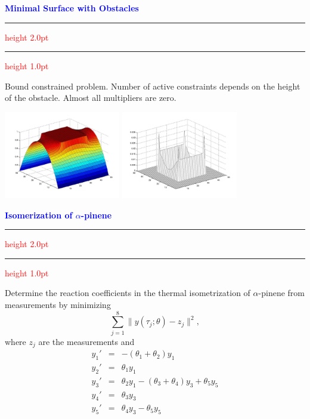 \documentclass{seminar}
\newcommand{\redstripe}{\textcolor{red}{\hrule height 2.0pt\hfil}
             \vspace{-1.8pt}
             \textcolor{red}{\hrule height 1.0pt\hfil}
}
\newcommand{\heading}[1]{%
   \centerline{\textcolor{blue}{\textbf{#1}}}%
    \redstripe%
    \bigskip
}
\begin{document}
\begin{slide}

\heading{Minimal Surface with Obstacles}

Bound constrained problem. 
Number of active constraints depends on the height of the
obstacle. Almost all multipliers are zero. 

\bigskip

\centerline {\includegraphics[height=1.5in]{../images/mso_s}
             \includegraphics[height=1.5in]{../images/mso_e}}

\end{slide}



\begin{slide}

\heading{Isomerization of $ \alpha $-pinene}

Determine the reaction coefficients
in the thermal isometrization of $\alpha$-pinene from measurements by minimizing
\[
\sum _ {j=1}^8 \| y ( \tau_j ; \theta ) - z_j \| ^ 2 ,
\]
where $z_j$ are the measurements and
\begin{eqnarray*}
y_1'  & = & -(\theta_1 + \theta_2) y_1 \\
y_2'  & = & \theta_1 y_1 \\
y_3'  & = & \theta_2 y_1 - (\theta_3 + \theta_4 )y_3 + \theta_5 y_5 \\
y_4'  & = & \theta_3 y_3 \\
y_5'  & = & \theta_4 y_3 - \theta_5 y_5 \nonumber
\end{eqnarray*}

\vfill

\end{slide}
\end{document}
